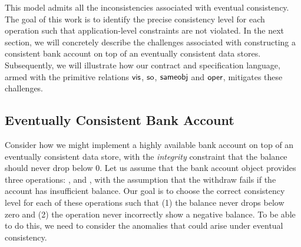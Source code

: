 This model admits all the inconsistencies associated with eventual
consistency. The goal of this work is to identify the precise consistency
level for each operation such that application-level constraints are not
violated. In the next section, we will concretely describe the challenges
associated with constructing a consistent bank account on top of an
eventually consistent data stores. Subsequently, we will illustrate how our
contract and specification language, armed with the primitive relations
${\normalfont \textsf{vis}}$, ${\normalfont \textsf{so}}$, ${\normalfont \textsf{sameobj}}$ and ${\normalfont \textsf{oper}}$, mitigates these challenges.

\subsection{Eventually Consistent Bank Account}

Consider how we might implement a highly available bank account on top of an
eventually consistent data store, with the \emph{integrity} constraint that
the balance should never drop below 0. Let us assume that the bank account
object provides three operations: ,  and
, with the assumption that the withdraw fails if the account
has insufficient balance. Our goal is to choose the correct consistency
level for each of these operations such that (1) the balance never drops
below zero and (2) the  operation never incorrectly show a
negative balance. To be able to do this, we need to consider the anomalies
that could arise under eventual consistency.

